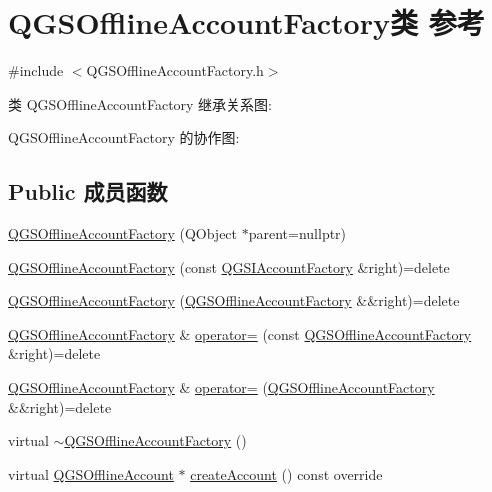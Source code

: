 \hypertarget{class_q_g_s_offline_account_factory}{}\section{Q\+G\+S\+Offline\+Account\+Factory类 参考}
\label{class_q_g_s_offline_account_factory}


{\ttfamily \#include $<$Q\+G\+S\+Offline\+Account\+Factory.\+h$>$}



类 Q\+G\+S\+Offline\+Account\+Factory 继承关系图\+:


Q\+G\+S\+Offline\+Account\+Factory 的协作图\+:
\subsection*{Public 成员函数}
\begin{DoxyCompactItemize}
\item 
\mbox{\hyperlink{class_q_g_s_offline_account_factory_a21a16e0c0443193fa0dcd0ff385844c4}{Q\+G\+S\+Offline\+Account\+Factory}} (Q\+Object $\ast$parent=nullptr)
\item 
\mbox{\hyperlink{class_q_g_s_offline_account_factory_a69ddcd203d5c5e848fded25d902d8ade}{Q\+G\+S\+Offline\+Account\+Factory}} (const \mbox{\hyperlink{class_q_g_s_i_account_factory}{Q\+G\+S\+I\+Account\+Factory}} \&right)=delete
\item 
\mbox{\hyperlink{class_q_g_s_offline_account_factory_a3dbecfe3148da98e12791998cf9b57b6}{Q\+G\+S\+Offline\+Account\+Factory}} (\mbox{\hyperlink{class_q_g_s_offline_account_factory}{Q\+G\+S\+Offline\+Account\+Factory}} \&\&right)=delete
\item 
\mbox{\hyperlink{class_q_g_s_offline_account_factory}{Q\+G\+S\+Offline\+Account\+Factory}} \& \mbox{\hyperlink{class_q_g_s_offline_account_factory_a9b80619b1368a818154423958c0dd70e}{operator=}} (const \mbox{\hyperlink{class_q_g_s_offline_account_factory}{Q\+G\+S\+Offline\+Account\+Factory}} \&right)=delete
\item 
\mbox{\hyperlink{class_q_g_s_offline_account_factory}{Q\+G\+S\+Offline\+Account\+Factory}} \& \mbox{\hyperlink{class_q_g_s_offline_account_factory_aad8f5af758d74a9920e6f5903e37e738}{operator=}} (\mbox{\hyperlink{class_q_g_s_offline_account_factory}{Q\+G\+S\+Offline\+Account\+Factory}} \&\&right)=delete
\item 
virtual \mbox{\hyperlink{class_q_g_s_offline_account_factory_a2c57d693c7734d2906278cb07002b2bc}{$\sim$\+Q\+G\+S\+Offline\+Account\+Factory}} ()
\item 
virtual \mbox{\hyperlink{class_q_g_s_offline_account}{Q\+G\+S\+Offline\+Account}} $\ast$ \mbox{\hyperlink{class_q_g_s_offline_account_factory_a81a5c6a8106b0f0fd0644358b69dd925}{create\+Account}} () const override
\end{DoxyCompactItemize}


